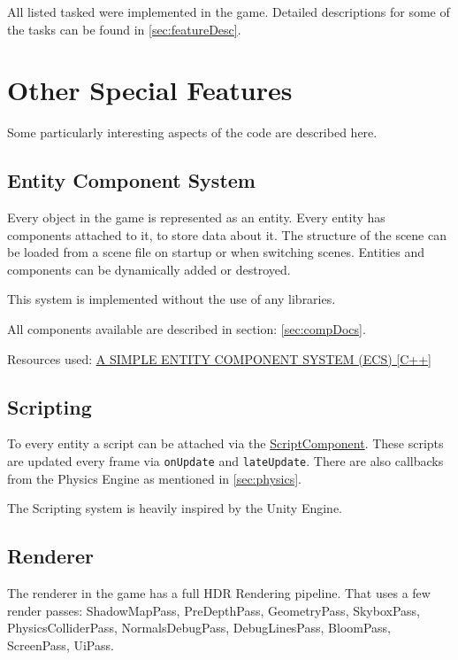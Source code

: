 \documentclass{article}
\begin{document}
    All listed tasked were implemented in the game. Detailed descriptions for some of the tasks can be found in \ref{sec:featureDesc}.

    \section{Other Special Features}

    Some particularly interesting aspects of the code are described here.

    \subsection{Entity Component System}

    Every object in the game is represented as an entity. Every entity has components attached to it, to store data about it. The structure of the scene can be loaded from a scene file on startup or when switching scenes. Entities and components can be dynamically added or destroyed.

    This system is implemented without the use of any libraries.

    All components available are described in section: \ref{sec:compDocs}.

    Resources used: \href{https://austinmorlan.com/posts/entity_component_system/}{A SIMPLE ENTITY COMPONENT SYSTEM (ECS) [C++]}

    \subsection{Scripting}

    To every entity a script can be attached via the \href{https://github.com/Liioooo/cgue23-pac3D/blob/master/docs/md/COMPONENTS_DOCS.md#scriptcomponent}{ScriptComponent}. These scripts are updated every frame via \verb|onUpdate| and \verb|lateUpdate|. There are also callbacks from the Physics Engine as mentioned in \ref{sec:physics}.

    The Scripting system is heavily inspired by the Unity Engine.

    \subsection{Renderer}

    The renderer in the game has a full HDR Rendering pipeline. That uses a few render passes: ShadowMapPass, PreDepthPass, GeometryPass, SkyboxPass, PhysicsColliderPass, NormalsDebugPass, DebugLinesPass, BloomPass, ScreenPass, UiPass.
\end{document}
